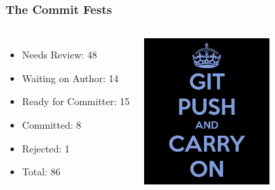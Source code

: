\documentclass{beamer}
\begin{document}
\begin{frame}
  \frametitle{The Commit Fests}

  \vfill

  \begin{columns}[c]

    \vfill
    \begin{itemize}
    \item Needs Review: 48
    \item Waiting on Author: 14
    \item Ready for Committer: 15
    \item Committed: 8
    \item Rejected: 1
    \item Total: 86
    \end{itemize}
    
    \begin{center}
      \includegraphics[height=15em]{git-push-and-carry-on.png}
    \end{center}
  \end{columns}
\end{frame}
\end{document}
